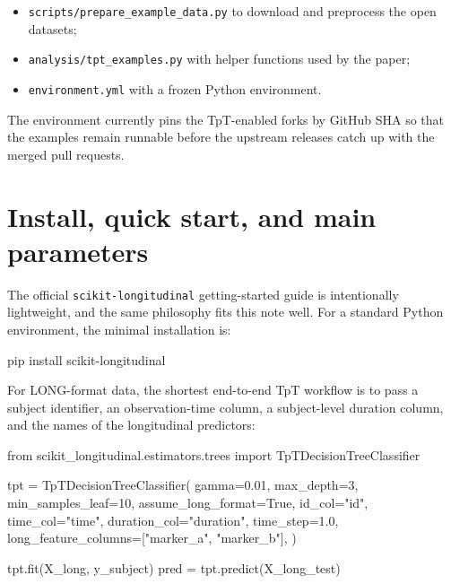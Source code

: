 \documentclass[
  letterpaper,
  DIV=11,
  numbers=noendperiod]{scrartcl}
\newenvironment{Shaded}{\begin{snugshade}}{\end{snugshade}}
\newcommand{\DecValTok}[1]{\textcolor[rgb]{0.68,0.00,0.00}{#1}}
\newcommand{\ExtensionTok}[1]{\textcolor[rgb]{0.00,0.23,0.31}{#1}}
\newcommand{\FloatTok}[1]{\textcolor[rgb]{0.68,0.00,0.00}{#1}}
\newcommand{\ImportTok}[1]{\textcolor[rgb]{0.00,0.46,0.62}{#1}}
\newcommand{\NormalTok}[1]{\textcolor[rgb]{0.00,0.23,0.31}{#1}}
\newcommand{\OperatorTok}[1]{\textcolor[rgb]{0.37,0.37,0.37}{#1}}
\newcommand{\StringTok}[1]{\textcolor[rgb]{0.13,0.47,0.30}{#1}}
\newcommand{\VariableTok}[1]{\textcolor[rgb]{0.07,0.07,0.07}{#1}}
\providecommand{\tightlist}{%
  \setlength{\itemsep}{0pt}\setlength{\parskip}{0pt}}
\begin{document}
\begin{itemize}
\tightlist
\item
  \texttt{scripts/prepare\_example\_data.py} to download and preprocess
  the open datasets;
\item
  \texttt{analysis/tpt\_examples.py} with helper functions used by the
  paper;
\item
  \texttt{environment.yml} with a frozen Python environment.
\end{itemize}

The environment currently pins the TpT-enabled forks by GitHub SHA so
that the examples remain runnable before the upstream releases catch up
with the merged pull requests.

\section{Install, quick start, and main
parameters}\label{install-quick-start-and-main-parameters}

The official \texttt{scikit-longitudinal} getting-started guide is
intentionally lightweight, and the same philosophy fits this note well.
For a standard Python environment, the minimal installation is:

\begin{Shaded}
\begin{Highlighting}[]
\ExtensionTok{pip}\NormalTok{ install scikit{-}longitudinal}
\end{Highlighting}
\end{Shaded}

For LONG-format data, the shortest end-to-end TpT workflow is to pass a
subject identifier, an observation-time column, a subject-level duration
column, and the names of the longitudinal predictors:

\begin{Shaded}
\begin{Highlighting}[]
\ImportTok{from}\NormalTok{ scikit\_longitudinal.estimators.trees }\ImportTok{import}\NormalTok{ TpTDecisionTreeClassifier}

\NormalTok{tpt }\OperatorTok{=}\NormalTok{ TpTDecisionTreeClassifier(}
\NormalTok{    gamma}\OperatorTok{=}\FloatTok{0.01}\NormalTok{,}
\NormalTok{    max\_depth}\OperatorTok{=}\DecValTok{3}\NormalTok{,}
\NormalTok{    min\_samples\_leaf}\OperatorTok{=}\DecValTok{10}\NormalTok{,}
\NormalTok{    assume\_long\_format}\OperatorTok{=}\VariableTok{True}\NormalTok{,}
\NormalTok{    id\_col}\OperatorTok{=}\StringTok{"id"}\NormalTok{,}
\NormalTok{    time\_col}\OperatorTok{=}\StringTok{"time"}\NormalTok{,}
\NormalTok{    duration\_col}\OperatorTok{=}\StringTok{"duration"}\NormalTok{,}
\NormalTok{    time\_step}\OperatorTok{=}\FloatTok{1.0}\NormalTok{,}
\NormalTok{    long\_feature\_columns}\OperatorTok{=}\NormalTok{[}\StringTok{"marker\_a"}\NormalTok{, }\StringTok{"marker\_b"}\NormalTok{],}
\NormalTok{)}

\NormalTok{tpt.fit(X\_long, y\_subject)}
\NormalTok{pred }\OperatorTok{=}\NormalTok{ tpt.predict(X\_long\_test)}
\end{Highlighting}
\end{Shaded}
\end{document}
